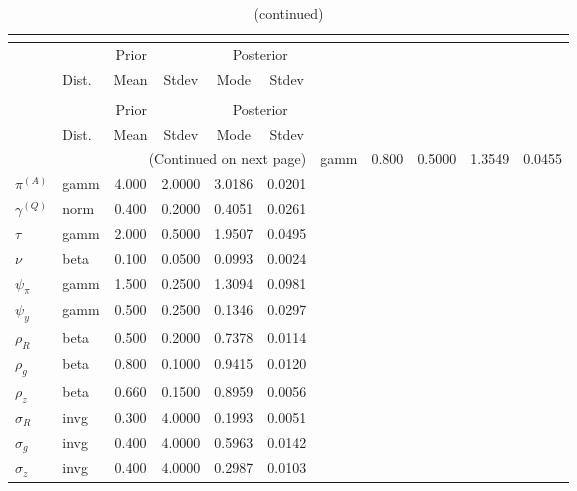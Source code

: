  
\begin{center}
\begin{longtable}{llcccc} 
\caption{Results from posterior maximization (parameters)}\\
 \label{Table:Posterior:1}\\
\toprule 
  & \multicolumn{3}{c}{Prior}  &  \multicolumn{2}{c}{Posterior} \\
  \cmidrule(r{.75em}){2-4} \cmidrule(r{.75em}){5-6}
  & Dist. & Mean  & Stdev & Mode & Stdev \\ 
\midrule \endfirsthead 
\caption{(continued)}\\
 \bottomrule 
  & \multicolumn{3}{c}{Prior}  &  \multicolumn{2}{c}{Posterior} \\
  \cmidrule(r{.75em}){2-4} \cmidrule(r{.75em}){5-6}
  & Dist. & Mean  & Stdev & Mode & Stdev \\ 
\midrule \endhead 
\bottomrule \multicolumn{6}{r}{(Continued on next page)}\endfoot 
\bottomrule\endlastfoot 
${r_{A}}$ & gamm &   0.800 & 0.5000 &   1.3549 &  0.0455 \\ 
${\pi^{(A)}}$ & gamm &   4.000 & 2.0000 &   3.0186 &  0.0201 \\ 
${\gamma^{(Q)}}$ & norm &   0.400 & 0.2000 &   0.4051 &  0.0261 \\ 
${\tau}$ & gamm &   2.000 & 0.5000 &   1.9507 &  0.0495 \\ 
${\nu}$ & beta &   0.100 & 0.0500 &   0.0993 &  0.0024 \\ 
${\psi_\pi}$ & gamm &   1.500 & 0.2500 &   1.3094 &  0.0981 \\ 
${\psi_y}$ & gamm &   0.500 & 0.2500 &   0.1346 &  0.0297 \\ 
${\rho_R}$ & beta &   0.500 & 0.2000 &   0.7378 &  0.0114 \\ 
${\rho_{g}}$ & beta &   0.800 & 0.1000 &   0.9415 &  0.0120 \\ 
${\rho_z}$ & beta &   0.660 & 0.1500 &   0.8959 &  0.0056 \\ 
${\sigma_R}$ & invg &   0.300 & 4.0000 &   0.1993 &  0.0051 \\ 
${\sigma_{g}}$ & invg &   0.400 & 4.0000 &   0.5963 &  0.0142 \\ 
${\sigma_z}$ & invg &   0.400 & 4.0000 &   0.2987 &  0.0103 \\ 
\end{longtable}
 \end{center}
